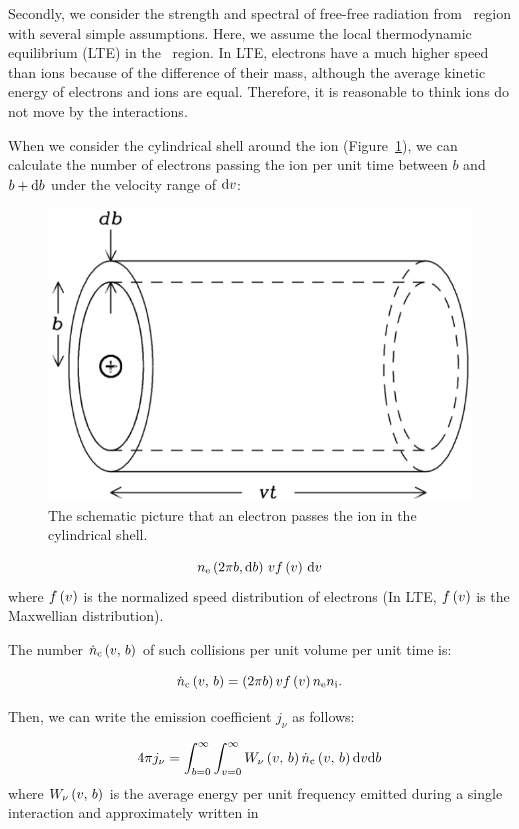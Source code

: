 Secondly, we consider the strength and spectral of free-free radiation from \ih~region with several simple assumptions.
Here, we assume the local thermodynamic equilibrium (LTE) in the \ih~region.
In LTE, electrons have a much higher speed than ions because of the difference of their mass, although the average kinetic energy of electrons and ions are equal.
Therefore, it is reasonable to think ions do not move by the interactions.

When we consider the cylindrical shell around the ion (Figure~\ref{fig:nrao_radio4n5}), we can calculate the number of electrons passing the ion per unit time between $b$ and $b + \mathrm{d} b$ under the velocity range of $\mathrm{d} v$:

\begin{figure}[htbp]
	\centering
	\includegraphics[width=.6\linewidth]{Chapter_2/Figures/NRAO_radio4n5.png}
    \caption[The schematic picture of the cylindrical shell of electrons]{\label{fig:nrao_radio4n5}
        The schematic picture that an electron passes the ion in the cylindrical shell.
    }
\end{figure}

\begin{equation}\label{eq:essential_radio4n27}
    n_{\mathrm{e}} \left(2\pi b,\mathrm{d} b\right)\,v f\left(v\right)\,\mathrm{d} v
\end{equation}
where $f\left(v\right)$ is the normalized speed distribution of electrons (In LTE, $f\left(v\right)$ is the Maxwellian distribution).

The number $\dot{n}_{\mathrm{c}}\left(v,\,b\right)$ of such collisions per unit volume per unit time is:

\begin{equation}\label{eq:essential_radio4n28}
    \dot{n}_{\mathrm{c}}\left(v,\,b\right) = \left(2\pi b\right) v f\left(v\right) n_{\mathrm{e}} n_{\mathrm{i}}.
\end{equation}

Then, we can write the emission coefficient $j_{\nu}$ as follows:

\begin{equation}\label{eq:essential_radio4n29}
    4 \pi j_{\nu}=\int_{b=0}^{\infty} \int_{v=0}^{\infty} W_{\nu}\left(v,\,b\right) \dot{n}_{\mathrm{c}}\left(v,\,b\right) \mathrm{d} v \mathrm{d} b
\end{equation}
where $W_{\mathrm{\nu}}\left(v,\,b\right)$ is the average energy per unit frequency emitted during a single interaction and approximately written in

